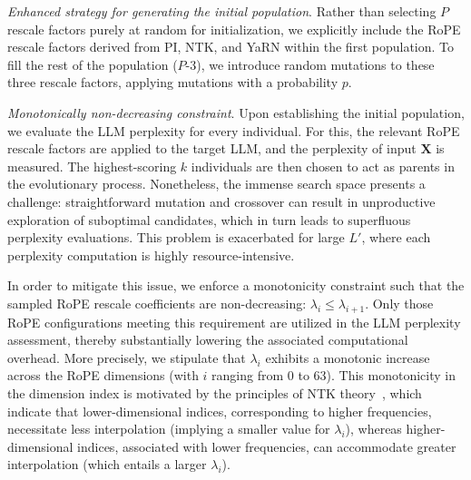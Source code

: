 \textit{Enhanced strategy for generating the initial population}. Rather than selecting $P$ rescale factors purely at random for initialization, we explicitly include the RoPE rescale factors derived from PI, NTK, and YaRN within the first population. To fill the rest of the population ($P$-3), we introduce random mutations to these three rescale factors, applying mutations with a probability $p$.

\textit{Monotonically non-decreasing constraint}. Upon establishing the initial population, we evaluate the LLM perplexity for every individual. For this, the relevant RoPE rescale factors are applied to the target LLM, and the perplexity of input $\mathbf{X}$ is measured. The highest-scoring $k$ individuals are then chosen to act as parents in the evolutionary process. Nonetheless, the immense search space presents a challenge: straightforward mutation and crossover can result in unproductive exploration of suboptimal candidates, which in turn leads to superfluous perplexity evaluations. This problem is exacerbated for large $L'$, where each perplexity computation is highly resource-intensive.

In order to mitigate this issue, we enforce a monotonicity constraint such that the sampled RoPE rescale coefficients are non-decreasing: $\lambda_i \leq \lambda_{i+1}$. Only those RoPE configurations meeting this requirement are utilized in the LLM perplexity assessment, thereby substantially lowering the associated computational overhead. More precisely, we stipulate that $\lambda_i$ exhibits a monotonic increase across the RoPE dimensions (with $i$ ranging from 0 to 63). This monotonicity in the dimension index is motivated by the principles of NTK theory~\cite{jacot2018neural,tancik2020fourier,ntk}, which indicate that lower-dimensional indices, corresponding to higher frequencies, necessitate less interpolation (implying a smaller value for $\lambda_i$), whereas higher-dimensional indices, associated with lower frequencies, can accommodate greater interpolation (which entails a larger $\lambda_i$).

